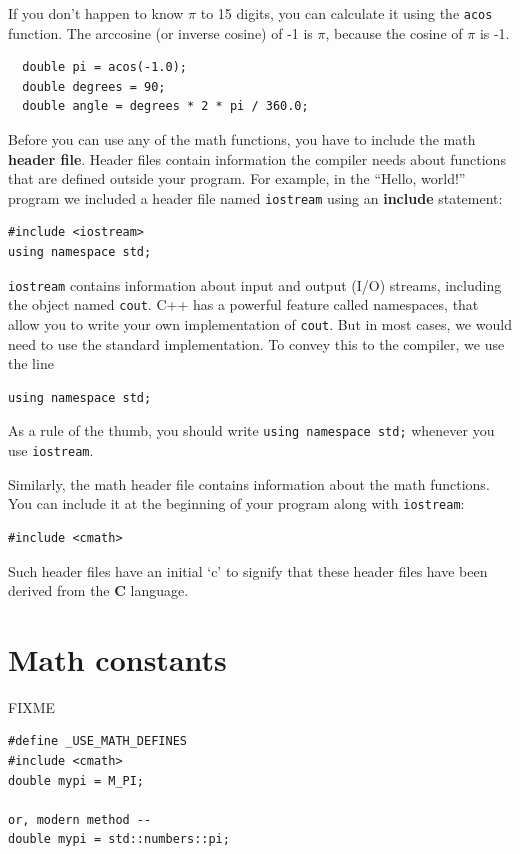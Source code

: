 If you don't happen to know $\pi$ to 15 digits, you can
calculate it using the {\tt acos} function.  The arccosine
(or inverse cosine) of -1 is $\pi$, because the cosine of
$\pi$ is -1.

\begin{verbatim}
  double pi = acos(-1.0);
  double degrees = 90;
  double angle = degrees * 2 * pi / 360.0;
\end{verbatim}
%
Before you can use any of the math functions, you have to
include the math {\bf header file}.  Header files contain
information the compiler needs about functions that are defined
outside your program.  For example, in the ``Hello, world!''
program we included a header file named {\tt iostream} using
an {\bf include} statement:

\begin{verbatim}
#include <iostream>
using namespace std;
\end{verbatim}
%
{\tt iostream} contains information about input and output
(I/O) streams, including the object named {\tt cout}.
C++ has a powerful feature called namespaces, that
allow you to write your own implementation of {\tt cout}.
But in most cases, we would need to use the standard implementation.
To convey this to the compiler, we use the line

\begin{verbatim}
using namespace std;
\end{verbatim}

As a rule of the thumb, you should write {\tt using namespace std;} whenever
you use {\tt iostream}.

Similarly, the math header file contains information
about the math functions.  You can include it at the beginning
of your program along with {\tt iostream}:

\begin{verbatim}
#include <cmath>
\end{verbatim}

Such header files have an initial `c' to signify that these
header files have been derived from the {\bf C} language.
\section{Math constants}
FIXME
\begin{verbatim}
#define _USE_MATH_DEFINES
#include <cmath>
double mypi = M_PI;

or, modern method --
double mypi = std::numbers::pi;
\end{verbatim}


